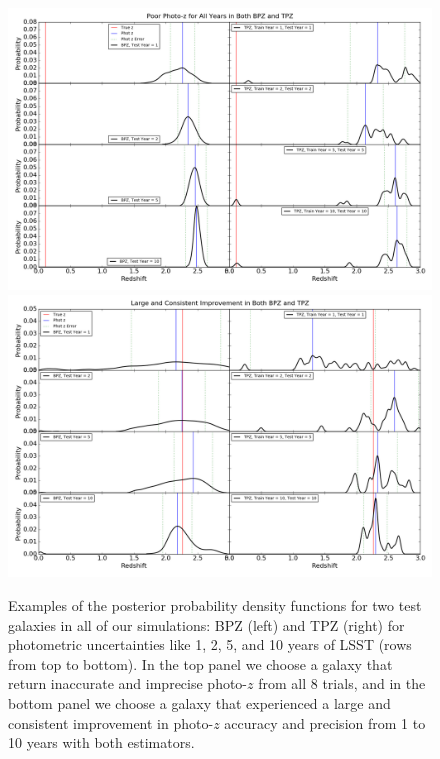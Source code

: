 \documentclass[DM,lsstdraft,toc]{lsstdoc}
\begin{document}
\begin{figure}
\begin{center}
\includegraphics[width=13cm]{figures/zpdf_g4.png}
\includegraphics[width=13cm]{figures/zpdf_g7.png}
\caption{Examples of the posterior probability density functions for two test galaxies in all of our simulations: BPZ (left) and TPZ (right) for photometric uncertainties like 1, 2, 5, and 10 years of LSST (rows from top to bottom). In the top panel we choose a galaxy that return inaccurate and imprecise photo-$z$ from all 8 trials, and in the bottom panel we choose a galaxy that experienced a large and consistent improvement in photo-$z$ accuracy and precision from 1 to 10 years with both estimators.  \label{fig:zpdf}}
\end{center}
\end{figure}
\end{document}
